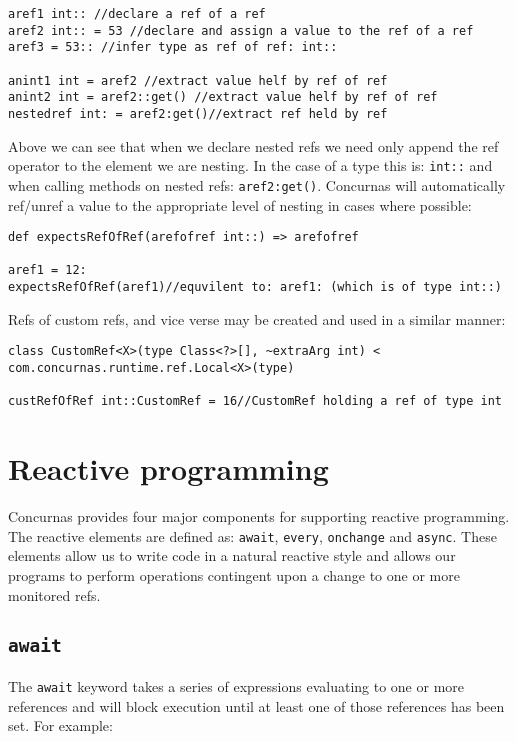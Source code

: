 \documentclass[conc-doc]{subfiles}
\begin{document}
\begin{lstlisting}
aref1 int:: //declare a ref of a ref
aref2 int:: = 53 //declare and assign a value to the ref of a ref
aref3 = 53:: //infer type as ref of ref: int::

anint1 int = aref2 //extract value helf by ref of ref
anint2 int = aref2::get() //extract value helf by ref of ref
nestedref int: = aref2:get()//extract ref held by ref
\end{lstlisting}

Above we can see that when we declare nested refs we need only append the ref operator to the element we are nesting. In the case of a type this is: \lstinline{int::} and when calling methods on nested refs: \lstinline{aref2:get()}. Concurnas will automatically ref/unref a value to the appropriate level of nesting in cases where possible:

\begin{lstlisting}
def expectsRefOfRef(arefofref int::) => arefofref

aref1 = 12:
expectsRefOfRef(aref1)//equvilent to: aref1: (which is of type int::)
\end{lstlisting}

Refs of custom refs, and vice verse may be created and used in a similar manner:
\begin{lstlisting}
class CustomRef<X>(type Class<?>[], ~extraArg int) < com.concurnas.runtime.ref.Local<X>(type)

custRefOfRef int::CustomRef = 16//CustomRef holding a ref of type int
\end{lstlisting}




\section{Reactive programming}
\label{sec:reactive}
Concurnas provides four major components for supporting reactive programming. The reactive elements are defined as: \lstinline{await}, \lstinline{every}, \lstinline{onchange} and \lstinline{async}. These elements allow us to write code in a natural reactive style and allows our programs to perform operations contingent upon a change to one or more monitored refs.


\subsection{\lstinline{await}}
The \lstinline{await} keyword takes a series of expressions evaluating to one or more references and will block execution until at least one of those references has been set. For example:
\end{document}
